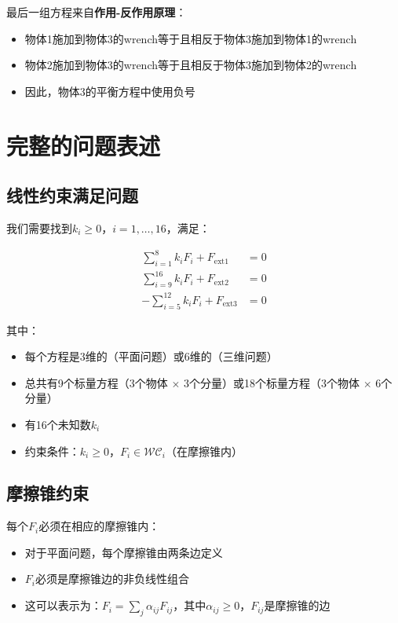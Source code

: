 \documentclass[12pt,a4paper]{article}
\begin{document}
最后一组方程来自\textbf{作用-反作用原理}：

\begin{itemize}
    \item 物体1施加到物体3的wrench等于且相反于物体3施加到物体1的wrench
    \item 物体2施加到物体3的wrench等于且相反于物体3施加到物体2的wrench
    \item 因此，物体3的平衡方程中使用负号
\end{itemize}

\section{完整的问题表述}

\subsection{线性约束满足问题}

我们需要找到$k_i \geq 0$，$i = 1, \ldots, 16$，满足：

\begin{align}
\sum_{i=1}^8 k_i F_i + F_{\text{ext}1} &= 0 \label{eq:system1} \\
\sum_{i=9}^{16} k_i F_i + F_{\text{ext}2} &= 0 \label{eq:system2} \\
-\sum_{i=5}^{12} k_i F_i + F_{\text{ext}3} &= 0 \label{eq:system3}
\end{align}

其中：
\begin{itemize}
    \item 每个方程是3维的（平面问题）或6维的（三维问题）
    \item 总共有9个标量方程（3个物体 $\times$ 3个分量）或18个标量方程（3个物体 $\times$ 6个分量）
    \item 有16个未知数$k_i$
    \item 约束条件：$k_i \geq 0$，$F_i \in \mathcal{WC}_i$（在摩擦锥内）
\end{itemize}

\subsection{摩擦锥约束}

每个$F_i$必须在相应的摩擦锥内：

\begin{itemize}
    \item 对于平面问题，每个摩擦锥由两条边定义
    \item $F_i$必须是摩擦锥边的非负线性组合
    \item 这可以表示为：$F_i = \sum_j \alpha_{ij} F_{ij}$，其中$\alpha_{ij} \geq 0$，$F_{ij}$是摩擦锥的边
\end{itemize}
\end{document}
